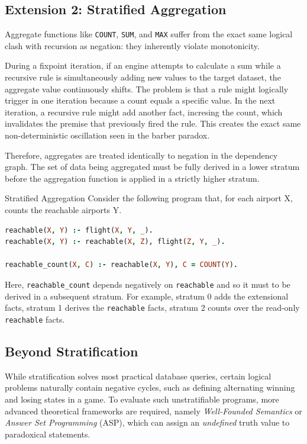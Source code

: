\subsection{Extension 2: Stratified Aggregation}

Aggregate functions like \texttt{COUNT}, \texttt{SUM}, and \texttt{MAX} suffer from the exact same logical clash with recursion as negation: they inherently violate monotonicity.

During a fixpoint iteration, if an engine attempts to calculate a sum while a recursive rule is simultaneously adding new values to the target dataset, the aggregate value continuously shifts. The problem is that a rule might logically trigger in one iteration because a count equals a specific value. 
In the next iteration, a recursive rule might add another fact, incresing the count, which invalidates the premise that previously fired the rule. 
This creates the exact same non-deterministic oscillation seen in the barber paradox.

Therefore, aggregates are treated identically to negation in the dependency graph. 
The set of data being aggregated must be fully derived in a lower stratum before the aggregation function is applied in a strictly higher stratum.

\begin{example}{Stratified Aggregation}
    Consider the following program that, for each airport X, counts the reachable airports Y. 
    \begin{lstlisting}[language=prolog]
reachable(X, Y) :- flight(X, Y, _).
reachable(X, Y) :- reachable(X, Z), flight(Z, Y, _).

reachable_count(X, C) :- reachable(X, Y), C = COUNT(Y).
    \end{lstlisting}
    Here, \texttt{reachable\_count} depends negatively on \texttt{reachable} and so it must to be derived in a subsequent stratum. For example, stratum 0 adds the extensional facts, stratum 1 derives the \texttt{reachable} facts, stratum 2 counts over the read-only \texttt{reachable} facts.
\end{example}

\subsection{Beyond Stratification}
While stratification solves most practical database queries, certain logical problems naturally contain negative cycles, such as defining alternating winning and losing states in a game. 
To evaluate such unstratifiable programs, more advanced theoretical frameworks are required, namely \emph{Well-Founded Semantics} or \emph{Answer Set Programming} (ASP), which can assign an \emph{undefined} truth value to paradoxical statements.


